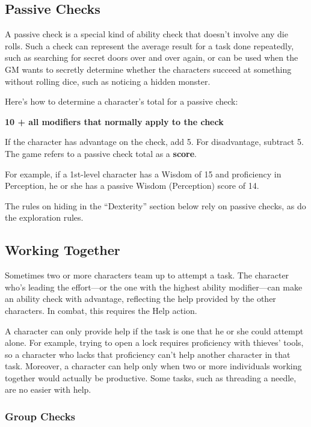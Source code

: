 \subsection{Passive Checks}

A passive check is a special kind of ability check that doesn't involve any die rolls. Such a check can represent the average result for a task done repeatedly, such as searching for secret doors over and over again, or can be used when the GM wants to secretly determine whether the characters succeed at something without rolling dice, such as noticing a hidden monster.

Here's how to determine a character's total for a passive check:

\textbf{10 + all modifiers that normally apply to the check}

If the character has advantage on the check, add 5. For disadvantage, subtract 5. The game refers to a passive check total as a \textbf{score}.

For example, if a 1st-level character has a Wisdom of 15 and proficiency in Perception, he or she has a passive Wisdom (Perception) score of 14.

The rules on hiding in the “Dexterity” section below rely on passive checks, as do the exploration rules.

\subsection{Working Together}

Sometimes two or more characters team up to attempt a task. The character who's leading the effort—or the one with the highest ability modifier—can make an ability check with advantage, reflecting the help provided by the other characters. In combat, this requires the Help action.

A character can only provide help if the task is one that he or she could attempt alone. For example, trying to open a lock requires proficiency with thieves' tools, so a character who lacks that proficiency can't help another character in that task. Moreover, a character can help only when two or more individuals working together would actually be productive. Some tasks, such as threading a needle, are no easier with help.

\subsubsection{Group Checks}

